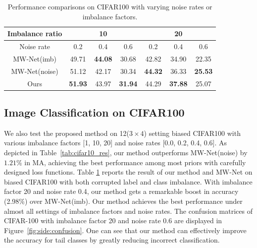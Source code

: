 \documentclass[letterpaper]{article} %
\begin{document}
\begin{table}[t]
\begin{center}
\begin{adjustbox}{max width=0.47\textwidth}
    \begin{tabular}{c|c|c|c|c|c|c}
    \hline
    Imbalance ratio &  \multicolumn{3}{c|}{10}    & \multicolumn{3}{c}{20} \\
    \hline
    Noise rate & 0.2   & 0.4   & \multicolumn{1}{c|}{0.6} & 0.2   & 0.4   & \multicolumn{1}{c}{0.6} \\
    \hline
    MW-Net(imb) & 49.71  & \textbf{44.08 } & 30.68  & 42.82  & 34.90  & 22.35  \\
    \hline
    MW-Net(noise) & 51.12  & 42.17  & 30.34  & \textbf{44.32}  & 36.33  & \textbf{25.53 } \\
    \hline
    Ours  & \textbf{51.93 } & 43.97  & \textbf{31.94 } & 44.29  & \textbf{37.88 } & 25.07  \\
    \hline
    \end{tabular}%
\end{adjustbox}
\caption{Performance comparisons on CIFAR100 with varying noise rates or imbalance factors.
}
\label{tab:cifar100_res_d}
\end{center}
\end{table}

\subsection{Image Classification on CIFAR100}
We also test the proposed method on 12($3 \times 4$) setting biased CIFAR100 with various imbalance factors [1, 10, 20] and noise rates [0.0, 0.2, 0.4, 0.6].
As depicted in Table~\ref{tab:cifar10_res}, our method outperforms MW-Net(noise) by $1.21\%$ in MA, achieving the best performance among most priors with carefully designed loss functions.
Table \ref{tab:cifar100_res_d} reports the result of our method and MW-Net on biased CIFAR100 with both corrupted label and class imbalance.
With imbalance factor 20 and noise rate 0.4, our method gets a remarkable boost in accuracy (2.98\%) over MW-Net(imb).
Our method achieves the best performance under almost all settings of imbalance factors and noise rates.
The confusion matrices of CIFAR-100 with imbalance factor 20 and noise rate 0.6 are displayed in Figure~\ref{fig:side:confusion}.
One can see that our method can effectively improve the accuracy for tail classes by greatly reducing incorrect classification.
\end{document}
